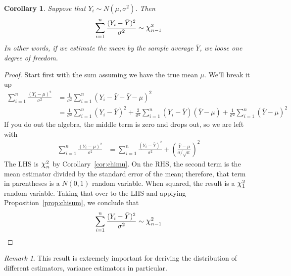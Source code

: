 \documentclass[12pt]{article}
\theoremstyle{plain}
\newtheorem{cor}[thm]{Corollary}
\theoremstyle{definition}
\theoremstyle{remark}
\newtheorem*{rmk}{Remark}
\newcommand*{\Chi}{\mbox{\large$\chi$}} %
\begin{document}
\begin{cor}
Suppose that $Y_i \sim N(\mu,\sigma^2)$. Then
\begin{align*}
  \sum^n_{i=1} \frac{(Y_i-\bar{Y})^2}{\sigma^2}  \sim \Chi^2_{n-1}
\end{align*}
In other words, if we estimate the mean by the sample average $\bar{Y}$,
we loose one degree of freedom.
\end{cor}
\begin{proof}
Start first with the sum assuming we have the true mean $\mu$. We'll
break it up
\begin{align*}
	 \sum^n_{i=1} \frac{(Y_i-\mu)^2}{\sigma^2} &= \frac{1}{
	    \sigma^2} \sum^n_{i=1} (Y_i - \bar{Y}+ \bar{Y}-\mu)^2 \\
	    &= \frac{1}{\sigma^2} \sum^n_{i=1}  (Y_i - \bar{Y})^2
	    + \frac{2}{\sigma^2} \sum^n_{i=1} (Y_i-\bar{Y})(\bar{Y}-\mu)
	    + \frac{1}{\sigma^2} \sum^n_{i=1} (\bar{Y}-\mu)^2
\end{align*}
If you do out the algebra, the middle term is zero and drops out, so we
are left with
\begin{align*}
	 \sum^n_{i=1} \frac{(Y_i-\mu)^2}{\sigma^2}
	 &= \sum^n_{i=1}\frac{(Y_i - \bar{Y})^2 }{\sigma^2} +
	    \left(\frac{\bar{Y}-\mu }{\sigma /\sqrt{n}}\right)^2
\end{align*}
The LHS is $\Chi^2_n$ by Corollary~\ref{cor:chimu}.
On the RHS, the second term is the mean estimator divided by the
standard error of the mean; therefore, that term in parentheses is a
$N(0,1)$ random variable. When squared, the result is a $\Chi_1^2$
random variable. Taking that over to the LHS and applying
Proposition~\ref{prop:chisum}, we conclude that
\begin{align*}
  \sum^n_{i=1}\frac{(Y_i - \bar{Y})^2}{\sigma^2}
  \sim \Chi^2_{n-1}
\end{align*}
\end{proof}
\begin{rmk}
This result is extremely important for deriving the distribution of
different estimators, variance estimators in particular.
\end{rmk}
\end{document}
